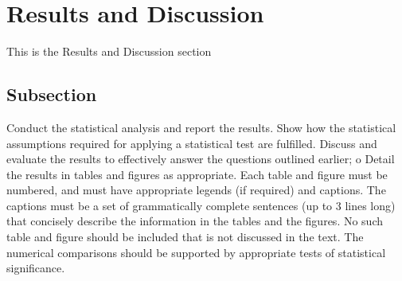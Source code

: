 \section{Results and Discussion}\label{Section label}
This is the Results and Discussion section
\subsection{Subsection}\label{subsection}
Conduct the statistical analysis and report the results. Show how the statistical assumptions required for applying a statistical test are fulfilled. Discuss and evaluate the results to effectively answer the questions outlined earlier; \newline
o	Detail the results in tables and figures as appropriate. Each table and figure must be numbered, and must have appropriate legends (if required) and captions. The captions must be a set of grammatically complete sentences (up to 3 lines long) that concisely describe the information in the tables and the figures. No such table and figure should be included that is not discussed in the text. The numerical comparisons should be supported by appropriate tests of statistical significance. 
